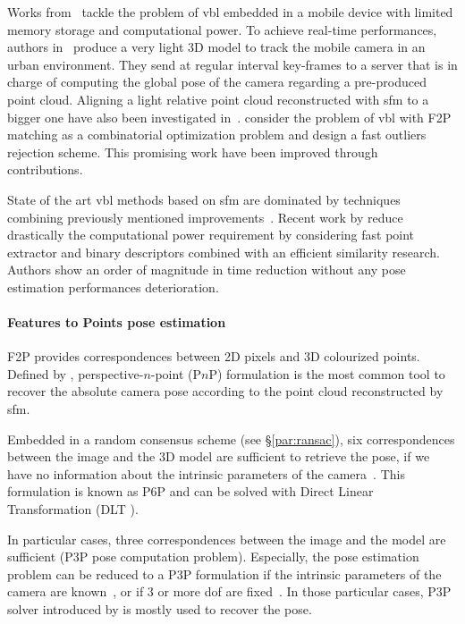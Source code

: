 Works from~\citep{Middelberg2014,Lynen2015} tackle the problem of \ac{vbl} embedded in a mobile device with limited memory storage and computational power. To achieve real-time performances, authors in~\citep{Middelberg2014} produce a very light 3D model to track the mobile camera in an urban environment. They send at regular interval key-frames to a server that is in charge of computing the global pose of the camera regarding a pre-produced point cloud. Aligning a light relative point cloud reconstructed with \ac{sfm} to a bigger one have also been investigated in~\citep{Lu2015}. \citet{Svarm2014} consider the problem of \ac{vbl} with F2P matching as a combinatorial optimization problem and design a fast outliers rejection scheme. This promising work have been improved through~\citep{Zeisl2015,Svarm2016} contributions.

State of the art \ac{vbl} methods based on \ac{sfm} are dominated by techniques combining previously mentioned improvements~\citep{Sattler2016a}. Recent work by \citet{Feng2016a} reduce drastically the computational power requirement by considering fast point extractor and binary descriptors combined with an efficient similarity research. Authors show an order of magnitude in time reduction without any pose estimation performances deterioration.

\paragraph{Features to Points pose estimation}
F2P provides correspondences between 2D pixels and 3D colourized points. Defined by \citet{Hartley2003}, perspective-$n$-point (P$n$P) formulation is the most common tool to recover the absolute camera pose according to the point cloud reconstructed by \ac{sfm}.

Embedded in a random consensus scheme (see \S\ref{par:ransac}), six correspondences between the image and the 3D model are sufficient to retrieve the pose, if we have no information about the intrinsic parameters of the camera~\citep{Donoser2014,Li2010,Li2010,Heisterklaus2014}. This formulation is known as P6P and can be solved with Direct Linear Transformation (DLT \citep{Hartley2003}).

In particular cases, three correspondences between the image and the model are sufficient (P3P pose computation problem). Especially, the pose estimation problem can be reduced to a P3P formulation if the intrinsic parameters of the camera are known~\citep{Irschara2009,Middelberg2014}, or if 3 or more \ac{dof} are fixed~\citep{Zeisl2015,Qu2016}. In those particular cases, P3P solver introduced by \citet{Kneip2011} is mostly used to recover the pose. 

